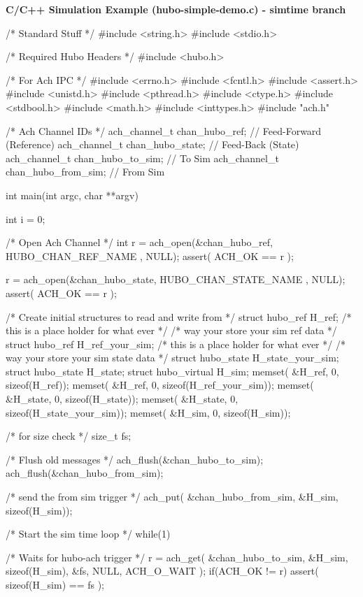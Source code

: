 \footnotesize
\noindent \textbf{C/C++ Simulation Example (hubo-simple-demo.c) - simtime branch}
\vspace{-6mm}
\begin{code}
/* Standard Stuff */
#include <string.h>
#include <stdio.h>

/* Required Hubo Headers */
#include <hubo.h>

/* For Ach IPC */
#include <errno.h>
#include <fcntl.h>
#include <assert.h>
#include <unistd.h>
#include <pthread.h>
#include <ctype.h>
#include <stdbool.h>
#include <math.h>
#include <inttypes.h>
#include "ach.h"

/* Ach Channel IDs */
ach_channel_t chan_hubo_ref;      // Feed-Forward (Reference)
ach_channel_t chan_hubo_state;    // Feed-Back (State)
ach_channel_t chan_hubo_to_sim;    // To Sim
ach_channel_t chan_hubo_from_sim;    // From Sim

int main(int argc, char **argv) {
    
    int i = 0;

    /* Open Ach Channel */
    int r = ach_open(&chan_hubo_ref, HUBO_CHAN_REF_NAME , NULL);
    assert( ACH_OK == r );

    r = ach_open(&chan_hubo_state, HUBO_CHAN_STATE_NAME , NULL);
    assert( ACH_OK == r );

    /* Create initial structures to read and write from */
    struct hubo_ref H_ref;
    /* this is a place holder for what ever */
    /* way your store your sim ref data     */
    struct hubo_ref H_ref_your_sim;  
    /* this is a place holder for what ever */
    /* way your store your sim state data   */
    struct hubo_state H_state_your_sim; 
    struct hubo_state H_state;
    struct hubo_virtual H_sim;
    memset( &H_ref,   0, sizeof(H_ref));
    memset( &H_ref,   0, sizeof(H_ref_your_sim));
    memset( &H_state, 0, sizeof(H_state));
    memset( &H_state, 0, sizeof(H_state_your_sim));
    memset( &H_sim, 0, sizeof(H_sim));

    /* for size check */
    size_t fs;

    /* Flush old messages */
    ach_flush(&chan_hubo_to_sim);
    ach_flush(&chan_hubo_from_sim);

    /* send the from sim trigger */
    ach_put( &chan_hubo_from_sim, &H_sim, sizeof(H_sim));

    /* Start the sim time loop */
    while(1) {
        /* Waits for hubo-ach trigger */
        r = ach_get( &chan_hubo_to_sim, &H_sim, sizeof(H_sim), &fs, NULL, ACH_O_WAIT );
        if(ACH_OK != r) {
            assert( sizeof(H_sim) == fs );
        }

}}
\end{code}
